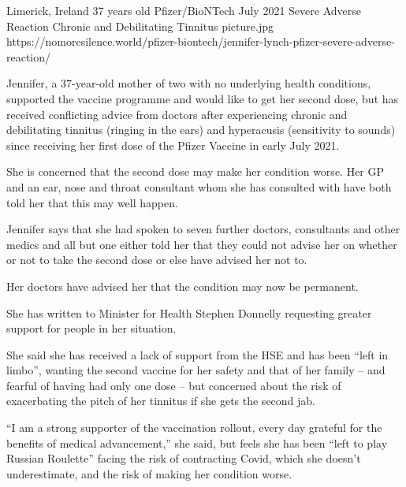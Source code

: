 {Limerick, Ireland}
{37 years old}
{Pfizer/BioNTech}
{July 2021}
{Severe Adverse Reaction Chronic and Debilitating Tinnitus}
{picture.jpg}
{https://nomoresilence.world/pfizer-biontech/jennifer-lynch-pfizer-severe-adverse-reaction/}
{

Jennifer, a 37-year-old mother of two with no underlying health conditions,
supported the vaccine programme and would like to get her second dose, but has
received conflicting advice from doctors after experiencing chronic and
debilitating tinnitus (ringing in the ears) and hyperacusis (sensitivity to
sounds) since receiving her first dose of the Pfizer Vaccine in early July 2021.

She is concerned that the second dose may make her condition worse. Her GP and
an ear, nose and throat consultant whom she has consulted with have both told
her that this may well happen.

Jennifer says that she had spoken to seven further doctors, consultants and
other medics and all but one either told her that they could not advise her on
whether or not to take the second dose or else have advised her not to.

Her doctors have advised her that the condition may now be permanent.

She has written to Minister for Health Stephen Donnelly requesting greater
support for people in her situation.

She said she has received a lack of support from the HSE and has been “left in
limbo”, wanting the second vaccine for her safety and that of her family – and
fearful of having had only one dose – but concerned about the risk of
exacerbating the pitch of her tinnitus if she gets the second jab.

“I am a strong supporter of the vaccination rollout, every day grateful for the
benefits of medical advancement,” she said, but feels she has been “left to play
Russian Roulette” facing the risk of contracting Covid, which she doesn’t
underestimate, and the risk of making her condition worse.

}
